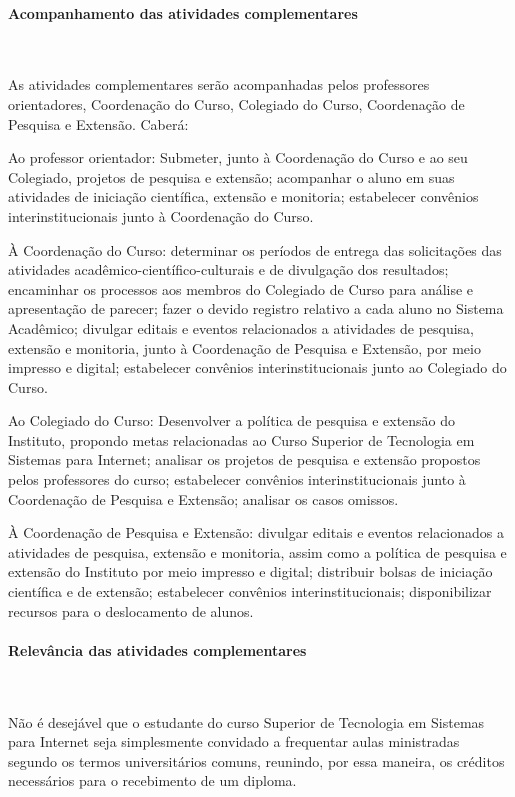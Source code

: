 \paragraph{Acompanhamento das atividades complementares}\

	
	As atividades complementares serão acompanhadas pelos professores orientadores, Coordenação do Curso, Colegiado do Curso, Coordenação de Pesquisa e Extensão. Caberá:
	
	Ao professor orientador: Submeter, junto à Coordenação do Curso e ao seu Colegiado, projetos de pesquisa e extensão; acompanhar o aluno em suas atividades de iniciação científica, extensão e monitoria; estabelecer convênios interinstitucionais junto à Coordenação do Curso.
	
	À Coordenação do Curso: determinar os períodos de entrega das solicitações das atividades acadêmico-científico-culturais e de divulgação dos resultados; encaminhar os processos aos membros do Colegiado de Curso para análise e apresentação de parecer; fazer o devido registro relativo a cada aluno no Sistema Acadêmico; divulgar editais e eventos relacionados a atividades de pesquisa, extensão e monitoria, junto à Coordenação de Pesquisa e Extensão, por meio impresso e digital; estabelecer convênios interinstitucionais junto ao Colegiado do Curso.
	
	Ao Colegiado do Curso: Desenvolver a política de pesquisa e extensão do Instituto, propondo metas relacionadas ao Curso Superior de Tecnologia em Sistemas para Internet; analisar os projetos de pesquisa e extensão propostos pelos professores do curso; estabelecer convênios interinstitucionais junto à Coordenação de Pesquisa e Extensão; analisar os casos omissos.
	
	À Coordenação de Pesquisa e Extensão: divulgar editais e eventos relacionados a atividades de pesquisa, extensão e monitoria, assim como a política de pesquisa e extensão do Instituto por meio impresso e digital; distribuir bolsas de iniciação científica e de extensão; estabelecer convênios interinstitucionais; disponibilizar recursos para o deslocamento de alunos.

\paragraph{Relevância das atividades complementares}\

	Não é desejável que o estudante do curso Superior de Tecnologia em Sistemas para Internet seja simplesmente convidado a frequentar aulas ministradas segundo os termos universitários comuns, reunindo, por essa maneira, os créditos necessários para o recebimento de um diploma.
	
